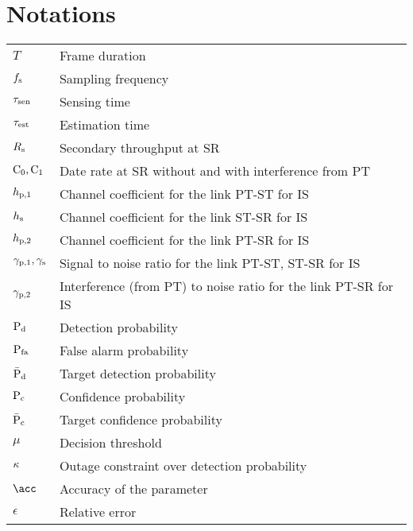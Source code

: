 
\chapter{Notations}
\renewcommand{\arraystretch}{1.4}
\begin{longtable}{p{}p{}}

       $T$                     &       Frame duration \\
       $f_{\text{s}}$                 &       Sampling frequency \\
       $\tau_{\text{sen}}$                 &       Sensing time \\
       $\tau_{\text{est}}$                 &       Estimation time \\      
       $R_{\text{s}}$                   &       Secondary throughput at SR \\
       $\text{C}_{\text{0}},\text{C}_{\text{1}}$               &       Date rate at SR without and with interference from PT  \\
      
       $h_{\text{p,1}}$                  &       Channel coefficient for the link PT-ST for IS \\
       $h_{\text{s}}$                   &       Channel coefficient for the link ST-SR for IS \\
       $h_{\text{p,2}}$                  &       Channel coefficient for the link PT-SR for IS \\
       ${\gamma}_{\text{p,1}}, {\gamma}_{\text{s}}$      &       Signal to noise ratio for the link PT-ST, ST-SR for IS \\
       ${\gamma}_{\text{p,2}}$                &       Interference (from PT) to noise ratio for the link PT-SR for IS \\

       $\text{P}_{\text{d}}$                   &       Detection probability \\ 
       $\text{P}_{\text{fa}}$                  &       False alarm probability \\ 
       $\bar{\text{P}}_{\text{d}}$                  &       Target detection probability \\ 
       $\text{P}_{\text{c}}$                  &       Confidence probability \\ 
       $\bar{\text{P}}_{\text{c}}$                 &       Target confidence probability \\ 
       $\mu$                   &       Decision threshold \\ 
       $\kappa$                  &       Outage constraint over detection probability \\ 
       $\acc$	               &       Accuracy of the parameter \\	
       $\epsilon$	       &       Relative error \\	
	

\end{longtable}

